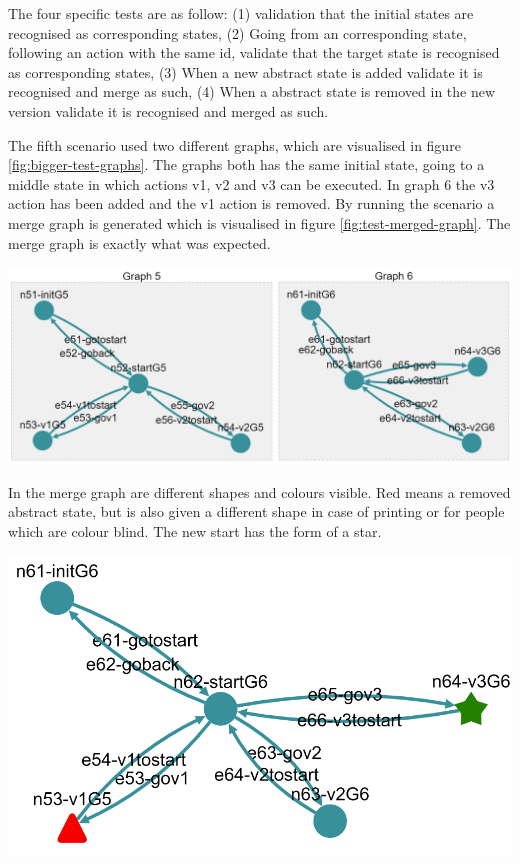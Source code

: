 
The four specific tests are as follow: (1) validation that the initial states are recognised as corresponding states, (2) Going from an corresponding state, following an action with the same id, validate that the target state is recognised as corresponding states, (3) When a new abstract state is added validate it is recognised and merge as such, (4) When a abstract state is removed in the new version validate it is recognised and merged as such.

The fifth scenario used two different graphs, which are visualised in figure \ref{fig:bigger-test-graphs}. The graphs both has the same initial state, going to a middle state in which actions v1, v2 and v3 can be executed. In graph 6 the v3 action has been added and the v1 action is removed. By running the scenario a merge graph is generated which is visualised in figure \ref{fig:test-merged-graph}. The merge graph is exactly what was expected. 

\begingroup
\captionsetup{type=figure}
\includegraphics[scale=0.5]{images/6-test-graph-5-6.png}
\label{fig:bigger-test-graphs}
\endgroup

In the merge graph are different shapes and colours visible. Red means a removed abstract state, but is also given a different shape in case of printing or for people which are colour blind. The new start has the form of a star. 

\begingroup
\captionsetup{type=figure}
\includegraphics[scale=0.5]{images/6-merge-result.png}
\label{fig:test-merged-graph}
\endgroup


